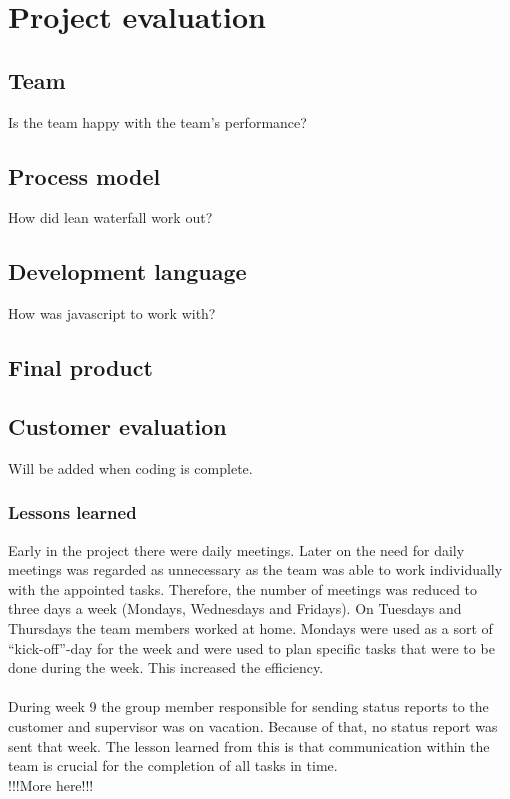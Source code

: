 \chapter{Project evaluation}

\section{Team}

Is the team happy with the team's performance?

\section{Process model}

How did lean waterfall work out?

\section{Development language}

How was javascript to work with?

\section{Final product}

\section{Customer evaluation}

Will be added when coding is complete.

\subsection{Lessons learned}

Early in the project there were daily meetings. Later on the need for daily meetings was regarded as unnecessary as the team was able to work individually with the appointed tasks. Therefore, the number of meetings was reduced to three days a week (Mondays, Wednesdays and Fridays). On Tuesdays and Thursdays the team members worked at home. Mondays were used as a sort of “kick-off”-day for the week and were used to plan specific tasks that were to be done during the week. This increased the efficiency.\\
\\
During week 9 the group member responsible for sending status reports to the customer and supervisor was on vacation. Because of that, no status report was sent that week. The lesson learned from this is that communication within the team is crucial for the completion of all tasks in time.\\

!!!More here!!!
